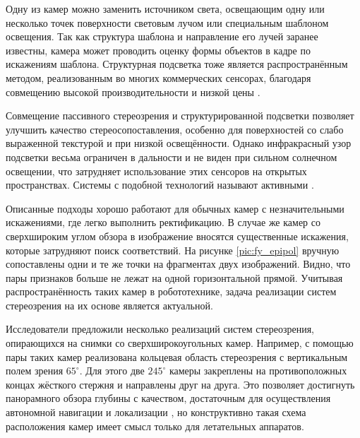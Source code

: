 Одну из камер можно заменить источником  света, освещающим одну или несколько точек поверхности световым лучом или специальным шаблоном освещения.  %
Так как структура шаблона и направление его  лучей заранее известны, камера может проводить оценку формы объектов в кадре по искажениям шаблона\cite{shapiro}. 
Структурная подсветка тоже является распространённым методом, реализованным во многих коммерческих сенсорах,  благодаря совмещению высокой производительности 
и  низкой цены \cite{struct_light}.  

Совмещение пассивного стереозрения и структурированной подсветки позволяет улучшить качество стереосопоставления, особенно для поверхностей со слабо выраженной текстурой
и при низкой освещённости. Однако инфракрасный узор подсветки весьма ограничен в дальности и не виден при сильном солнечном освещении, что затрудняет использование этих    %
сенсоров на открытых пространствах. Системы с подобной технологий называют активными \cite{kinect_perf}. 


Описанные подходы хорошо работают для обычных камер с незначительными искажениями, где легко выполнить ректификацию. 		
В случае  же камер со сверхшироким углом обзора в изображение вносятся существенные искажения, которые затрудняют поиск соответствий. На 
рисунке \ref{pic:fy_epipol} вручную сопоставлены одни и те же точки на фрагментах двух изображений. Видно, что пары признаков больше не лежат
на одной горизонтальной прямой.  Учитывая распространённость таких  камер в робототехнике, задача реализации систем стереозрения на их основе 
является актуальной.    %


Исследователи предложили несколько реализаций систем стереозрения, опирающихся на снимки со сверхширокоугольных камер. 
Например, с помощью  пары таких камер реализована  кольцевая область стереозрения с вертикальным  %
полем зрения $65^\circ$\cite{omni_stereo}. Для этого две $245^\circ$ камеры закреплены на противоположных концах жёсткого стержня 
и направлены друг на друга.  
Это позволяет достигнуть панорамного обзора глубины с качеством, достаточным для осуществления автономной навигации и
локализации \cite{omni_copter}, но конструктивно такая схема расположения камер имеет смысл только для летательных аппаратов.  

